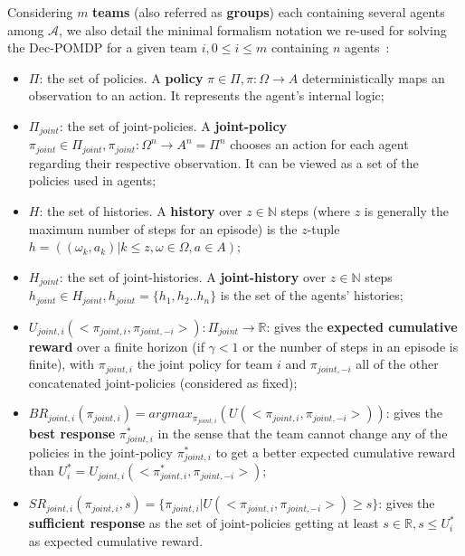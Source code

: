 \documentclass{ecai}
\begin{document}
Considering $m$ \textbf{teams} (also referred as \textbf{groups}) each containing several agents among $\mathcal{A}$, we also detail the minimal formalism notation we re-used for solving the Dec-POMDP for a given team $i, 0 \leq i \leq m$ containing $n$ agents~\citep{Beynier2013,Albrecht2024}:

\begin{itemize}

    \item $\Pi$: the set of policies. A \textbf{policy} $\pi \in \Pi, \pi: \Omega \rightarrow A$ deterministically maps an observation to an action. It represents the agent's internal logic;
    \item $\Pi_{joint}$: the set of joint-policies. A \textbf{joint-policy} $\pi_{joint} \in \Pi_{joint}, \pi_{joint}: \Omega^n \rightarrow A^n = \Pi^n$ chooses an action for each agent regarding their respective observation. It can be viewed as a set of the policies used in agents;
    \item $H$: the set of histories. A \textbf{history} over $z \in \mathbb{N}$ steps (where $z$ is generally the maximum number of steps for an episode) is the $z$-tuple $h = ((\omega_{k}, a_{k}) | k \leq z, \omega \in \Omega, a \in A)$;
    \item $H_{joint}$: the set of joint-histories. A \textbf{joint-history} over $z \in \mathbb{N}$ steps $h_{joint} \in H_{joint}, h_{joint} = \{h_1,h_2..h_n\}$ is the set of the agents' histories;
    \item $U_{joint,i}(<\pi_{joint,i}, \pi_{joint,-i}>): \Pi_{joint} \rightarrow \mathbb{R}$: gives the \textbf{expected cumulative reward} over a finite horizon (if $\gamma < 1$ or the number of steps in an episode is finite), with $\pi_{joint,i}$ the joint policy for team $i$ and $\pi_{joint,-i}$ all of the other concatenated joint-policies (considered as fixed);
    \item $BR_{joint,i}(\pi_{joint,i}) = argmax_{\pi_{joint,i}}(U(<\pi_{joint,i},\pi_{joint,-i}>))$: gives the \textbf{best response} $\pi_{joint,i}^*$ in the sense that the team cannot change any of the policies in the joint-policy $\pi_{joint,i}^*$ to get a better expected cumulative reward than $U_i^* = U_{joint,i}(<\pi_{joint,i}^*, \pi_{joint,-i}>)$;
    \item $SR_{joint,i}(\pi_{joint,i}, s) = \{\pi_{joint,i} | U(<\pi_{joint,i},\pi_{joint,-i}>) \geq s\}$: gives the \textbf{sufficient response} as the set of joint-policies getting at least $s \in \mathbb{R}, s \leq U_i^*$ as expected cumulative reward.
\end{itemize}
\end{document}
